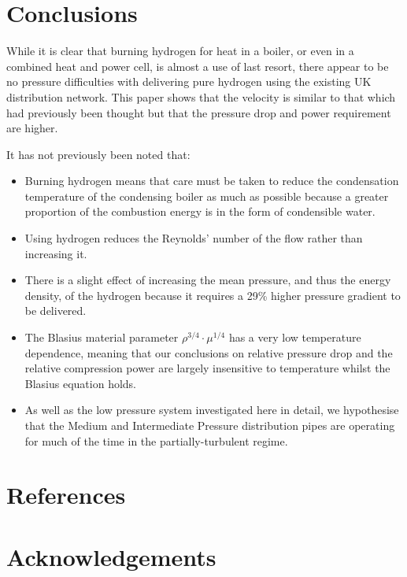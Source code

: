 \documentclass[5p]{elsarticle} %
\begin{document}
\section{Conclusions}
\label{sec:conc}

While it is clear that burning hydrogen for heat in a boiler, or even in a combined heat and power cell, is almost a use of last resort\citep{Rosenow2024,Liebreich2021}, there appear to be no pressure difficulties with delivering pure hydrogen using the existing UK distribution network. This paper shows that the velocity is similar to that which had previously been thought but that the pressure drop and power requirement are higher.

It has not previously been noted that:
\begin{itemize}

    \item Burning hydrogen means that care must be taken to reduce the condensation temperature of the condensing boiler as much as possible because a greater proportion of the combustion energy is in the form of condensible water.
    \item Using hydrogen reduces the Reynolds' number of the flow rather than increasing it.  
    \item There is a slight effect of increasing the mean pressure, and thus the energy density, of the hydrogen because it requires a 29\% higher pressure gradient to be delivered.
    \item The Blasius material parameter $\rho^{3/4} \cdot \mu^{1/4}$ has a very low temperature dependence, meaning that our conclusions on relative pressure drop and the relative compression power are largely insensitive to temperature whilst the Blasius equation holds.
    \item As well as the low pressure system investigated here in detail, we hypothesise that the Medium and Intermediate Pressure distribution pipes are operating for much of the time in the partially-turbulent regime.
\end{itemize}

\section{References}


\section*{Acknowledgements}
\label{sec:ending}
\end{document}
